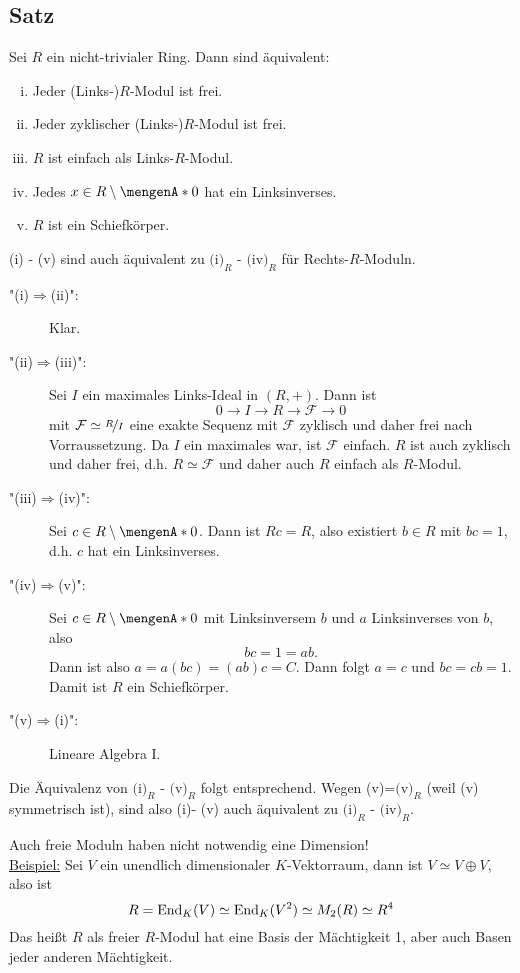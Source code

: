 \subsection[Satz: Äquivalenzen zu: $M$ ist $R$-Moduln über einem Schiefkörper $R$]{Satz} %
\label{sub:238}
Sei $R$ ein nicht-trivialer Ring. Dann sind äquivalent:
\begin{enumerate}[(i)]
	\item Jeder (Links-)$R$-Modul ist frei.
	\item Jeder zyklischer (Links-)$R$-Modul ist frei.
	\item $R$ ist einfach als Links-$R$-Modul.
	\item Jedes $x \in R \setminus \set{0}$ hat ein Linksinverses.
	\item $R$ ist ein Schiefkörper.
\end{enumerate}
(i) - (v) sind auch äquivalent zu $\text{(i)}_R$ - $\text{(iv)}_R$ für Rechts-$R$-Moduln.
\begin{description}
	\item["(i)$\Rightarrow$(ii)":] Klar. 
	\item["(ii)$\Rightarrow $(iii)":] Sei $I$ ein maximales Links-Ideal in $(R,+)$. Dann ist 
	\[
		0 \to I  \to R \to \mathcal{F} \to 0
	\]
	mit $\mathcal{F} \simeq \nicefrac{R}{I}$ eine exakte Sequenz mit $\mathcal{F}$ zyklisch und daher frei nach Vorraussetzung. Da $I$ ein maximales war, ist $\mathcal{F}$
	einfach. $R$ ist auch zyklisch und daher frei, d.h. $R \simeq \mathcal{F}$ und daher auch $R$ einfach als $R$-Modul.
	\item["(iii)$\Rightarrow $(iv)":] Sei $c \in R \setminus \set{0} $. Dann ist $Rc=R$, also existiert $b \in R$ mit $b c = 1$, d.h. $c$ hat ein Linksinverses.
	\item["(iv)$\Rightarrow$(v)":] Sei $c \in R \setminus \set{0}$ mit Linksinversem $b$ und $a$ Linksinverses von $b$, also
	\[
		b c = 1 = a b.
	\]
	Dann ist also $a = a (b c) = (a b) c = C$. Dann folgt $a=c$ und $b c= c b = 1$. Damit ist $R$ ein Schiefkörper.
	\item["(v)$\Rightarrow$(i)":] Lineare Algebra I.
\end{description}
Die Äquivalenz von $\text{(i)}_R$ - $\text{(v)}_R$ folgt entsprechend. Wegen (v)=$\text{(v)}_R$ (weil (v) symmetrisch ist), sind also (i)- (v) auch äquivalent zu
$\text{(i)}_R$ - $\text{(iv)}_R$. \bewende

Auch freie Moduln haben nicht notwendig eine Dimension! \\
\uline{Beispiel:} Sei $V$ ein unendlich dimensionaler $K$-Vektorraum, dann ist $V \simeq V \oplus V$, also ist 
\[
	R = \operatorname{End}_K(V) \simeq \operatorname{End}_K(V^2) \simeq M_2(R) \simeq R^4
\]
Das heißt $R$ als freier $R$-Modul hat eine Basis der Mächtigkeit 1, aber auch Basen jeder anderen Mächtigkeit.


